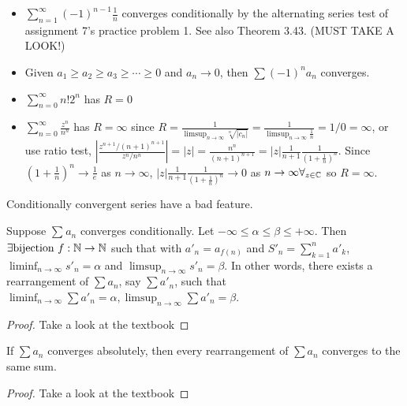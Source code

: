 \begin{example}
	\begin{itemize}
		\item $\sum_{n=1}^{\infty}{(-1)^{n-1}\frac{1}{n}}$ converges conditionally by the alternating series test of assignment 7's practice problem 1. See also Theorem 3.43. (MUST TAKE A LOOK!)
		\item Given $a_1\ge a_2\ge a_3\ge \cdots \ge 0$ and $a_{n}\to 0$, then $\sum{(-1)^{n}a_{n}}$ converges.
		\item $\sum_{n=0}^{\infty}{n!2^{n}}$ has $R=0$
		\item $\sum_{n=0}^{\infty}{\frac{z^{n}}{n^{n}}}$ has $R=\infty$ since $R=\frac{1}{\limsup_{n\to \infty}{\sqrt[n]{|c_{n}|}}}=\frac{1}{\limsup_{n\to \infty}{\frac{1}{n}}}=1/0=\infty$, or use ratio test, $|\frac{z^{n+1}/(n+1)^{n+1}}{z^{n}/n^{n}}|=|z|=\frac{n^{n}}{(n+1)^{n+1}}=|z|\frac{1}{n+1} \frac{1}{(1+\frac{1}{n})^{n}}$.
		      Since $(1+\frac{1}{n})^{n} \to  \frac{1}{e}$ as $n\to \infty$,
		      $|z|\frac{1}{n+1} \frac{1}{(1+\frac{1}{n})^{n}} \to 0$ as $n\to \infty \forall_{z \in \mathbb{C}}$ so $R=\infty$.
	\end{itemize}
\end{example}

\begin{remark}
	Conditionally convergent series have a bad feature.
\end{remark}

\begin{theorem}[Thm 3.54]
	\label{thm:3.54}
	Suppose $\sum_{}{a_{n}}$ converges conditionally.
	Let $-\infty\le \alpha\le \beta\le +\infty$. Then $\exists \text{bijection }f: \mathbb{N}\to \mathbb{N}$ such that with $a'_{n}=a_{f(n)}$ and $S'_n=\sum_{k=1}^{n}{a'_k}$, $\liminf_{n\to \infty}{s'_n}=\alpha$ and $\limsup_{n\to \infty}{s'_n}=\beta$. In other words, there exists a rearrangement of $\sum{a_n}$, say $\sum{a'_n}$, such that $\liminf_{n\to \infty}{\sum{a'_n}}=\alpha, \limsup_{n\to \infty}{\sum{a'_n}}=\beta$.
	\begin{proof}
		Take a look at the textbook
	\end{proof}
\end{theorem}

\begin{theorem}[Thm 3.55]
	\label{thm:3.55}
	If $\sum{a_{n}}$ converges absolutely, then every rearrangement of $\sum{a_{n}}$ converges to the same sum.
	\begin{proof}
		Take a look at the textbook
	\end{proof}
\end{theorem}

